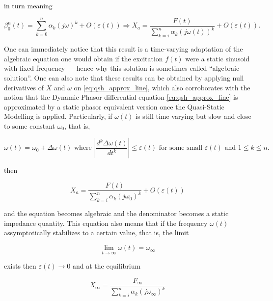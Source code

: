 	\noindent in turn meaning

\begin{equation} \beta_0^n(t) = \sum\limits_{k=0}^{n} \alpha_k \left(j\omega\right)^k + O\left(\varepsilon(t)\right) \Rightarrow X_a = \dfrac{F(t)}{\displaystyle \sum\limits_{k=i}^{n} \alpha_k \left( j\omega\left(t\right) \right)^{k}} + O\left(\varepsilon(t)\right). \label{eq:qsh_approx_composition}\end{equation}

	One can immediately notice that this result is a time-varying adaptation of the algebraic equation one would obtain if the excitation $f(t)$ were a static sinusoid with fixed frequency — hence why this solution is sometimes called ``algebraic solution''. One can also note that these results can be obtained by applying null derivatives of $X$ and $\omega$ on \eqref{eq:qsh_approx_line}, which also corroborates with the notion that the Dynamic Phasor differential equation \eqref{eq:qsh_approx_line} is approximated by a static phasor equivalent version once the Quasi-Static Modelling is applied. Particularly, if $\omega(t)$ is still time varying but slow and close to some constant $\omega_0$, that is, 

\begin{equation} \omega(t) = \omega_0 + \Delta\omega(t) \text{ where } \left\lvert\dfrac{d^k\Delta\omega(t)}{dt^k}\right\rvert \leq \varepsilon(t) \text{ for some small } \varepsilon(t) \text{ and } 1\leq k \leq n. \label{eq:close_and_slow}\end{equation}

	\noindent then

\begin{equation} X_a = \dfrac{F(t)}{\displaystyle \sum\limits_{k=i}^{n} \alpha_k \left( j\omega_0\right)^k} + O\left(\varepsilon(t)\right)\end{equation}

	\noindent and the equation becomes algebraic and the denominator becomes a static impedance quantity. This equation also means that if the frequency $\omega(t)$ assymptotically stabilizes to a certain value, that is, the limit

\begin{equation} \lim_{t\to\infty} \omega(t) = \omega_\infty \end{equation}

	\noindent exists then $\varepsilon(t)\to 0$ and at the equilibrium

	\begin{equation} X_\infty = \dfrac{F_\infty}{\displaystyle \sum\limits_{k=i}^{n} \alpha_k \left( j\omega_\infty\right)^k}\end{equation}

